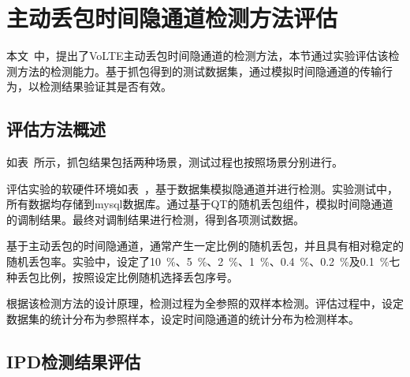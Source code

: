 \section{主动丢包时间隐通道检测方法评估}
\label{chap:analyze:result}

本文\ 中，提出了VoLTE主动丢包时间隐通道的检测方法，本节通过实验评估该检测方法的检测能力。基于抓包得到的测试数据集，通过模拟时间隐通道的传输行为，以检测结果验证其是否有效。

\subsection{评估方法概述}
\label{chap:analyze:result:abstract}

如表\ 所示，抓包结果包括两种场景，测试过程也按照场景分别进行。


评估实验的软硬件环境如表\ ，基于数据集模拟隐通道并进行检测。实验测试中，所有数据均存储到mysql数据库。通过基于QT的随机丢包组件，模拟时间隐通道的调制结果。最终对调制结果进行检测，得到各项测试数据。

基于主动丢包的时间隐通道，通常产生一定比例的随机丢包，并且具有相对稳定的随机丢包率。实验中，设定了10\ \%、5\ \%、2\ \%、1\ \%、0.4\ \%、0.2\ \%及0.1\ \%七种丢包比例，按照设定比例随机选择丢包序号。

根据该检测方法的设计原理，检测过程为全参照的双样本检测。评估过程中，设定数据集的统计分布为参照样本，设定时间隐通道的统计分布为检测样本。

\subsection{IPD检测结果评估}
\label{chap:analyze:result:ipd}

